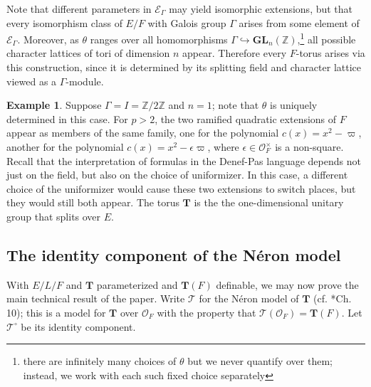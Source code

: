 \documentclass{amsart}
\newcommand{\Z}{{\mathbb Z}}
\newcommand{\ri}{\mathcal{O}}
\newcommand{\GL}{\mathbf {GL}}
\newcommand{\bT}{\mathbf {T}}
\newcommand\cE{{\mathcal E}}
\newcommand{\Ner}[1]{\mathcal{#1}}
\newcommand{\NerC}[1]{\mathcal{#1}^\circ}
\theoremstyle{plain}
\theoremstyle{definition}
\newtheorem{rem}[thm]{Remark}
\newtheorem{example}[thm]{Example}
\begin{document}
Note that different parameters in $\cE_\Gamma$ may yield isomorphic extensions, but that every isomorphism class of $E/F$ with Galois group $\Gamma$
arises from some element of $\cE_\Gamma$.  Moreover, as $\theta$ ranges over all homomorphisms
$\Gamma \hookrightarrow \GL_n(\Z)$,\footnote{there are infinitely many choices of $\theta$
but we never quantify over them; instead, we work with each such fixed choice separately}
all possible character lattices of tori of dimension $n$ appear. Therefore every $F$-torus
arises via this construction, since it is determined by its splitting field and character lattice viewed as a $\Gamma$-module. 
\begin{example}
Suppose $\Gamma = I = \Z / 2\Z$ and $n=1$; note that $\theta$ is uniquely determined in this case.
For $p > 2$, the two ramified quadratic extensions of $F$ appear as members of the same family,
one for the polynomial $c(x) = x^2-\varpi$, another for the polynomial $c(x) = x^2-\epsilon\varpi$,
where $\epsilon \in \ri_F^\times$ is a non-square.
Recall that the interpretation of formulas in the Denef-Pas language depends not just on the field,
but also on the choice of uniformizer. In this case, a different choice of the uniformizer
would cause these two extensions to switch places, but they would still both appear.
The torus $\bT$ is the the one-dimensional unitary group that splits over $E$.
\end{example}

\subsection{The identity component of the N\'eron model} \label{sub:NerCdefinable}

With $E/L/F$ and $\bT$ parameterized and $\bT(F)$ definable, we may now prove the main technical result of the paper.
Write $\Ner{T}$ for the N\'eron model of $\bT$ (cf. \cite{bosch-lutkebohmert-raynaud:neron}*{Ch. 10}); this is a model for $\bT$ over $\ri_F$ with the property that $\Ner{T}(\ri_F) = \bT(F)$.  Let $\NerC{T}$ be its identity component.
\end{document}
